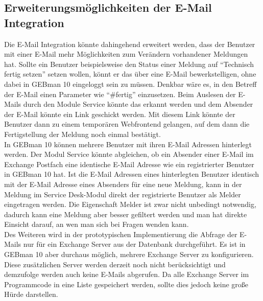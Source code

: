\subsection{Erweiterungsmöglichkeiten der E-Mail Integration}
\noindent
Die E-Mail Integration könnte dahingehend erweitert werden, dass der Benutzer mit einer E-Mail mehr Möglichkeiten zum Verändern vorhandener Meldungen hat. Sollte ein Benutzer beispielsweise den Status einer Meldung auf \enquote{Technisch fertig setzen} setzen wollen, könnt er das über eine E-Mail bewerkstelligen, ohne dabei in GEBman 10 eingeloggt sein zu müssen. Denkbar wäre es, in den Betreff der E-Mail einen Parameter wie \enquote{\#fertig} einzusetzen. Beim Auslesen der E-Mails durch den Module Service könnte das erkannt werden und dem Absender der E-Mail könnte ein Link geschickt werden. Mit diesem Link könnte der Benutzer dann zu einem temporären Webfrontend gelangen, auf dem dann die Fertigstellung der Meldung noch einmal bestätigt.\\

\noindent
In GEBman 10 können mehrere Benutzer mit ihren E-Mail Adressen hinterlegt werden. Der Modul Service könnte abgleichen, ob ein Absender einer E-Mail im Exchange Postfach eine identische E-Mail Adresse wie ein registrierter Benutzer in GEBman 10 hat. Ist die E-Mail Adressen eines hinterlegten Benutzer identisch mit der E-Mail Adresse eines Absenders für eine neue Meldung, kann in der Meldung im Service Desk-Modul direkt der registrierte Benutzer als Melder eingetragen werden. Die Eigenschaft Melder ist zwar nicht unbedingt notwendig, dadurch kann eine Meldung aber besser gefiltert werden und man hat direkte Einsicht darauf, an wen man sich bei Fragen wenden kann.\\

\noindent
Des Weiteren wird in der prototypischen Implementierung die Abfrage der E-Mails nur für ein Exchange Server aus der Datenbank durchgeführt. Es ist in GEBman 10 aber durchaus möglich, mehrere Exchange Server zu konfigurieren. Diese zusätzlichen Server werden derzeit noch nicht berücksichtigt und demzufolge werden auch keine E-Mails abgerufen. Da alle Exchange Server im Programmcode in eine Liste gespeichert werden, sollte dies jedoch keine große Hürde darstellen.

